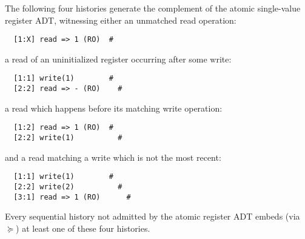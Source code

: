 \begin{example}
  \label{ex:patterns}

  The following four histories generate the complement of the atomic
  single-value register ADT, witnessing either an unmatched read operation:
\begin{verbatim}
  [1:X] read => 1 (RO)  #
\end{verbatim}
  a read of an uninitialized register occurring after some write:
\begin{verbatim}
  [1:1] write(1)        #
  [2:2] read => - (RO)    #
\end{verbatim}
  a read which happens before its matching write operation:
\begin{verbatim}
  [1:2] read => 1 (RO)  #
  [2:2] write(1)          #
\end{verbatim}
  and a read matching a write which is not the most recent:
\begin{verbatim}
  [1:1] write(1)        #
  [2:2] write(2)          #
  [3:1] read => 1 (RO)      #
\end{verbatim}
  Every sequential history not admitted by the atomic register ADT embeds
  (via $\succeq$) at least one of these four histories.

\end{example}
